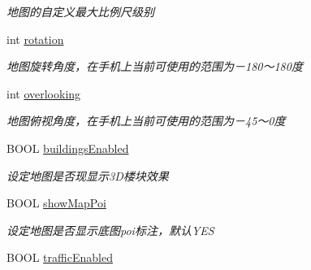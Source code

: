 \begin{DoxyCompactItemize}
\begin{DoxyCompactList}\small\item\em 地图的自定义最大比例尺级别 \end{DoxyCompactList}\item 
\hypertarget{interface_b_m_k_map_view_a344d3d4be5d00adfc22feaa2ab6869c4}{}int \hyperlink{interface_b_m_k_map_view_a344d3d4be5d00adfc22feaa2ab6869c4}{rotation}\label{interface_b_m_k_map_view_a344d3d4be5d00adfc22feaa2ab6869c4}

\begin{DoxyCompactList}\small\item\em 地图旋转角度，在手机上当前可使用的范围为－180～180度 \end{DoxyCompactList}\item 
\hypertarget{interface_b_m_k_map_view_a8ae6f6cf221ea4f14923150d8974f997}{}int \hyperlink{interface_b_m_k_map_view_a8ae6f6cf221ea4f14923150d8974f997}{overlooking}\label{interface_b_m_k_map_view_a8ae6f6cf221ea4f14923150d8974f997}

\begin{DoxyCompactList}\small\item\em 地图俯视角度，在手机上当前可使用的范围为－45～0度 \end{DoxyCompactList}\item 
\hypertarget{interface_b_m_k_map_view_abccbae8b8f7182769b8e0b69a4383ceb}{}B\+O\+O\+L \hyperlink{interface_b_m_k_map_view_abccbae8b8f7182769b8e0b69a4383ceb}{buildings\+Enabled}\label{interface_b_m_k_map_view_abccbae8b8f7182769b8e0b69a4383ceb}

\begin{DoxyCompactList}\small\item\em 设定地图是否现显示3\+D楼块效果 \end{DoxyCompactList}\item 
\hypertarget{interface_b_m_k_map_view_a26be634d93e06efd2d7268a99bcca52f}{}B\+O\+O\+L \hyperlink{interface_b_m_k_map_view_a26be634d93e06efd2d7268a99bcca52f}{show\+Map\+Poi}\label{interface_b_m_k_map_view_a26be634d93e06efd2d7268a99bcca52f}

\begin{DoxyCompactList}\small\item\em 设定地图是否显示底图poi标注，默认\+Y\+E\+S \end{DoxyCompactList}\item 
\hypertarget{interface_b_m_k_map_view_a513d0877fb66681b10ad7a4ed1346cb7}{}B\+O\+O\+L \hyperlink{interface_b_m_k_map_view_a513d0877fb66681b10ad7a4ed1346cb7}{traffic\+Enabled}\label{interface_b_m_k_map_view_a513d0877fb66681b10ad7a4ed1346cb7}


\end{DoxyCompactItemize}
